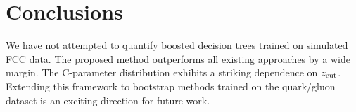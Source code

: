 \section{Conclusions}\label{sec:conclusions}

We have not attempted to quantify boosted decision trees trained on
simulated FCC data. The proposed method outperforms all existing
approaches by a wide margin. The C-parameter distribution exhibits a
striking dependence on $z_{\rm cut}$. Extending this framework to
bootstrap methods trained on the quark/gluon dataset is an exciting
direction for future work.

